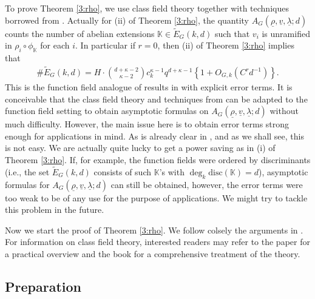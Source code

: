 \documentclass[12pt]{amsart}
\theoremstyle{plain}
\begin{document}
To prove Theorem \ref{3:rho}, we use class field theory together with techniques borrowed from \cite{woo,wri}. Actually for (ii) of Theorem \ref{3:rho}, the quantity ${A_{G}({\underline{{\rho}}},{\underline{{v}}},{\underline{{\lambda}}};d)}$ counts the number of abelian extensions ${{\mathbb K}} \in \widetilde{E}_G(k,d)$ such that $v_i$ is unramified in $\rho_i \circ {\phi_{{\mathbb K}}}$ for each $i$. In particular if $r=0$, then (ii) of Theorem \ref{3:rho} implies that
\begin{eqnarray} \label{3:egkd} \#\widetilde{E}_G(k,d)=H \cdot \binom{d+\kappa-2}{\kappa-2}  c_k^{\kappa-1}q^{d+\kappa-1} \left\{1+O_{G,k}\left(C^rd^{-1}\right)\right\}. \end{eqnarray}
This is the function field analogue of results in \cite{woo,wri} with explicit error terms. It is conceivable that the class field theory and techniques from \cite{woo,wri} can be adapted to the function field setting to obtain asymptotic formulas on ${A_{G}({\underline{{\rho}}},{\underline{{v}}},{\underline{{\lambda}}};d)}$ without much difficulty. However, the main issue here is to obtain error terms strong enough for applications in mind. As is already clear in \cite{woo,wri}, and as we shall see, this is not easy. We are actually quite lucky to get a power saving as in (i) of Theorem \ref{3:rho}. If, for example, the function fields were ordered by discriminants (i.e., the set $\widetilde{E}_G(k,d)$ consists of such ${{\mathbb K}}$'s with $\deg_k \mathrm{disc}({{\mathbb K}})=d$), asymptotic formulas for ${A_{G}({\underline{{\rho}}},{\underline{{v}}},{\underline{{\lambda}}};d)}$ can still be obtained, however, the error terms were too weak to be of any use for the purpose of applications. We might try to tackle this problem in the future.

Now we start the proof of Theorem \ref{3:rho}. We follow colsely the arguments in \cite{woo}. For information on class field theory, interested readers may refer to the paper \cite{wri} for a practical overview and the book \cite{neu} for a comprehensive treatment of the theory.

\subsection{Preparation}
\end{document}
